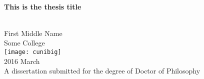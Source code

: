\ifpdf
\fi
%
%
\begin{center}
 \qquad\\[10mm]
 {\renewcommand\baselinestretch{1.2}\Huge\textbf{
   This is the thesis title
 }\par}
 \qquad\\[50mm]
 {\LARGE First Middle Name}\\[10mm]
 {\large Some College}\\[10mm]
 \texttt{[image: cunibig]}\\[60mm]
 {\Large 2016 March}\\[10mm]
 {\large A dissertation submitted for the degree of Doctor of Philosophy}
\end{center}

\cleardoublepage

\endinput
